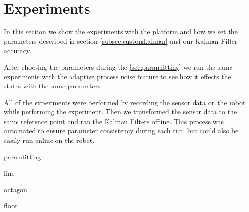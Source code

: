 \documentclass[class=report, crop=false]{standalone}
\begin{document}
\chapter{Experiments}

In this section we show the experiments with the platform and how we set the parameters described in section \ref{subsec:customkalman} and our Kalman Filter accuracy.

After choosing the parameters during the \ref{sec:paramfitting} we run the same experiments with the adaptive process noise feature to see how it effects the states with the same parameters.

All of the experiments were performed by recording the sensor data on the robot while performing the experiment. Then we transformed the sensor data to the same reference point and ran the Kalman Filters offline. This process was automated to ensure parameter consistency during each run, but could also be easily run online on the robot.

{paramfitting}

{line}

{octagon}

{floor}
\end{document}
